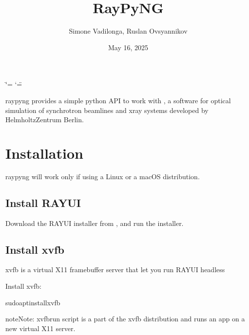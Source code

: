 \documentclass[letterpaper,10pt,english]{sphinxmanual}
\title{RayPyNG}
\date{May 16, 2025}
\author{Simone Vadilonga, Ruslan Ovsyannikov}
\begin{document}
\ifdefined\shorthandoff
  \ifnum\catcode`\=\string=\active\shorthandoff{=}\fi
  \ifnum\catcode`\"=\active{}\fi
\fi

\pagestyle{empty}
\sphinxmaketitle
\pagestyle{plain}
\sphinxtableofcontents
\pagestyle{normal}
\label{\detokenize{index::doc}}


\sphinxAtStartPar
raypyng provides a simple python API to work with
,
a software for optical simulation of synchrotron
beamlines and x\sphinxhyphen{}ray systems developed by
Helmholtz\sphinxhyphen{}Zentrum Berlin.

\sphinxstepscope


\chapter{Installation}
\label{\detokenize{installation:installation}}\label{\detokenize{installation::doc}}
\sphinxAtStartPar
raypyng will work only if using a Linux or a macOS distribution.


\section{Install RAY\sphinxhyphen{}UI}
\label{\detokenize{installation:install-ray-ui}}
\sphinxAtStartPar
Download the RAY\sphinxhyphen{}UI installer from  ,
and run the installer.


\section{Install xvfb}
\label{\detokenize{installation:install-xvfb}}
\sphinxAtStartPar
xvfb is a virtual X11 framebuffer server that let you run RAY\sphinxhyphen{}UI headless

\sphinxAtStartPar
Install xvfb:

\begin{sphinxVerbatim}[commandchars=\\\{\}]
sudoaptinstallxvfb
\end{sphinxVerbatim}

\begin{sphinxadmonition}{note}{Note:}
\sphinxAtStartPar
xvfb\sphinxhyphen{}run script is a part of the xvfb distribution and
runs an app on a new virtual X11 server.
\end{sphinxadmonition}
\end{document}
